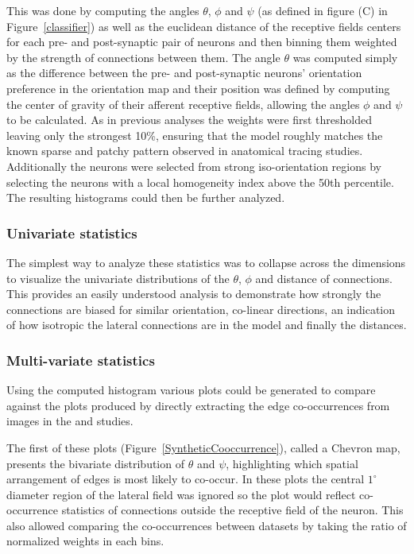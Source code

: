 This was done by computing the angles $\theta$, $\phi$ and $\psi$ (as
defined in figure (C) in Figure~\ref{classifier}) as well as the
euclidean distance of the receptive fields centers for each pre- and
post-synaptic pair of neurons and then binning them weighted by the
strength of connections between them. The angle $\theta$ was computed
simply as the difference between the pre- and post-synaptic neurons'
orientation preference in the orientation map and their position was
defined by computing the center of gravity of their afferent receptive
fields, allowing the angles $\phi$ and $\psi$ to be calculated. As in
previous analyses the weights were first thresholded leaving only the
strongest 10\%, ensuring that the model roughly matches the known
sparse and patchy pattern observed in anatomical tracing
studies. Additionally the neurons were selected from strong
iso-orientation regions by selecting the neurons with a local
homogeneity index above the 50th percentile. The resulting histograms
could then be further analyzed.

\subsubsection{Univariate statistics}

The simplest way to analyze these statistics was to collapse across
the dimensions to visualize the univariate distributions of the
$\theta$, $\phi$ and distance of connections. This provides an easily
understood analysis to demonstrate how strongly the connections are
biased for similar orientation, co-linear directions, an indication of
how isotropic the lateral connections are in the model and finally the
distances.

\subsubsection{Multi-variate statistics}

Using the computed histogram various plots could be generated to
compare against the plots produced by directly extracting the edge
co-occurrences from images in the \cite{Perrinet2015} and
\cite{Geisler2001} studies.

The first of these plots (Figure~\ref{SyntheticCooccurrence}), called
a Chevron map, presents the bivariate distribution of $\theta$ and
$\psi$, highlighting which spatial arrangement of edges is most likely
to co-occur. In these plots the central $1^\circ$ diameter region of
the lateral field was ignored so the plot would reflect co-occurrence
statistics of connections outside the receptive field of the
neuron. This also allowed comparing the co-occurrences between
datasets by taking the ratio of normalized weights in each bins.

